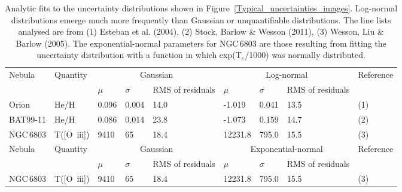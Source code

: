 \documentclass[useAMS,usenatbib]{mn2e}
\begin{document}
\begin{table}
\begin{tabular}{lllllllll}
\hline
Nebula & Quantity & \multicolumn{3}{c}{Gaussian} & \multicolumn{3}{c}{Log-normal} & Reference \\
       &          & $\mu$ & $\sigma$ & RMS of residuals & $\mu$ & $\sigma$ & RMS of residuals\\
\hline
Orion    & He/H     & 0.096             & 0.004 & 14.0 & -1.019 & 0.041 & 13.5 & (1) \\
BAT99-11 & He/H     & 0.086             & 0.014 & 23.8 & -1.073 & 0.159 & 14.7 & (2) \\
NGC\,6803 & T([O~{\sc iii}]) & 9410 & 65 & 18.4 & 12231.8 & 795.0 & 15.5 & (3) \\
Nebula & Quantity & \multicolumn{3}{c}{Gaussian} & \multicolumn{3}{c}{Exponential-normal} & Reference \\
       &          & $\mu$ & $\sigma$ & RMS of residuals & $\mu$ & $\sigma$ & RMS of residuals\\
NGC\,6803 & T([O~{\sc iii}]) & 9410 & 65 & 18.4 & 12231.8 & 795.0 & 15.5 & (3)\\
\hline
\end{tabular}
\caption{Analytic fits to the uncertainty distributions shown in Figure~\ref{Typical_uncertainties_images}.  Log-normal distributions emerge much more frequently than Gaussian or unquantifiable distributions.  The line lists analysed are from (1) Esteban et al. (2004), (2) Stock, Barlow \& Wesson (2011), (3) Wesson, Liu \& Barlow (2005).  The exponential-normal parameters for NGC\,6803 are those resulting from fitting the uncertainty distribution with a function in which exp(T$_e$/1000) was normally distributed.}
\label{Typical_uncertainties_table}
\end{table}
\end{document}
